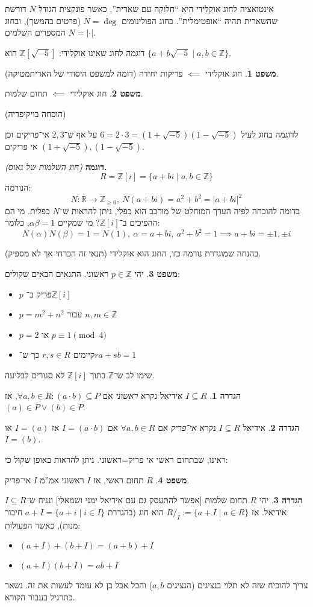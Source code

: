 \documentclass[a4paper]{article}
\newcommand\Z     {\mathbb{Z}}
\newcommand\R     {\mathbb{R}}
\newcommand\co        {\colon}
\newcommand\ag        {\alpha}
\newcommand\bg        {\beta}
\newcommand\sof[1]    {\left | #1 \right |}
\theoremstyle{definition}
\newtheorem{Theorem}{\color{myblue}משפט}
\newtheorem{Definition}{\color{mygreen}הגדרה}
\newcommand\theo  [1] {\begin{Theorem}#1\end{Theorem}}
\newcommand\defi  [1] {\begin{Definition}#1\end{Definition}}
\begin{document}
	אינטואציה לחוג אוקלידי היא ``חלוקה עם שארית'', כאשר פונקצית הגודל $N$ דורשת שהשארית תהיה ``אופטימלית''. בחוג הפולינומים $N = \deg$ (פרטים בהמשך), ובחוג המספרים השלמים $N = \sof{\cdot}$. 
	
	דוגמה לחוג שאינו אוקלידי: $\Z[\sqrt{-5}]$ הוא $\{a + b\sqrt{-5} \mid a, b \in \Z\}$. 
	
	\theo{חוג אוקלידי $\impliedby$ פריקות יחידה (דומה למשפט היסודי של האריתמטיקה). }
	\theo{חוג אוקלידי $\impliedby$ תחום שלמות. }(הוכחה בויקיפדיה)
	
	לדוגמה בחוג לעיל $6 = 2 \cdot 3 = (1 + \sqrt{-5})(1 - \sqrt{-5})$ על אף ש־$2, 3$ אי־פריקים וכן $(1 + \sqrt{-5}), (1  - \sqrt{-5})$ אי פריקים. 
	
	
	\textbf{דוגמה }\textit{(חוג השלמות של גאוס)}\textbf{. }
	\[ R = \Z[i] = \{a + bi \mid a, b \in \Z\} \]
	הנורמה: 
	\[ N \co \R\to \Z_{\ge 0}, \ N(a + bi) = a^2 + b^2 = |a + bi|^2 \]
	בדומה להוכחה לפיה הערך המוחלט של מורכב הוא כפלי, ניתן להראות ש־$N$ כפלית. מי הם ההפיכים ב־$\Z[i]$? מי שמקיים $\ag \bg = 1$, כלומר: 
	\[ N(\ag)N(\bg) = 1 = N(1), \ \ag = a + bi, \ a^2 + b^2 = 1 \implies a + bi = \pm 1, \pm i \]
	
	בהנחה שמוגדרת נורמה כזו, החוג הוא אוקלידי (תנאי זה הכרחי אך לא מספיק). 
	
	\theo{יהי $p \in \Z$ ראשוני. התנאים הבאים שקולים: 
		\begin{itemize}
			\item $p$ פריק ב־$\Z[i]$
			\item $p = m^2 + n^2$ עבור $n, m \in \Z$
			\item $p = 2$ או $p \equiv 1 \pmod{4} $
			\item קיימים $r, s \in R$ כך ש־$ra + sb = 1$
	\end{itemize}}
	
	שימו לב ש־$\Z$ בתוך $\Z[i]$ לא סגורים לבליעה. 
	
	\defi{$I \subseteq R$ אידיאל נקרא \textit{ראשוני} אם $\forall a, b \in R \co (a \cdot b) \subseteq P$, אז $(a) \in P \lor (b) \in P$. }
	\defi{אידיאל $I \subseteq R$ נקרא \textit{אי־פריק} אם $\forall a, b \in R$ אם $I = (a \cdot b)$ אז $I = (a)$ או $I = (b)$. }
	ראינו, שבתחום ראשי אי פריק=ראשוני. ניתן להראות באופן שקול כי: 
	\theo{$R$ תחום ראשי, אז $I$ ראשוני אמ''מ $I$ אי־פריק. }
	\defi{יהי $R$ תחום שלמות [אפשר להתעסק גם עם אידיאל ימני ושמאלי] ונניח ש־$I \subseteq R$ אידיאל. אז $R/_I := \{a + I \mid a \in R\}$ הוא חוג (בהגדרת $a + I = \{a + i \mid i \in I\}$ חיבור מנות), כאשר הפעולות: 
		\begin{itemize}
			\item $(a + I) + (b + I) = (a + b) + I$
			\item $(a + I)(b + I) = ab + I$
	\end{itemize}}
	צריך להוכיח שזה לא תלוי בנציגים (הנציגים $a, b$) והכל אבל בן לא עומד לעשות את זה. נשאר כתרגיל בעבור הקורא. 
	
\end{document}
